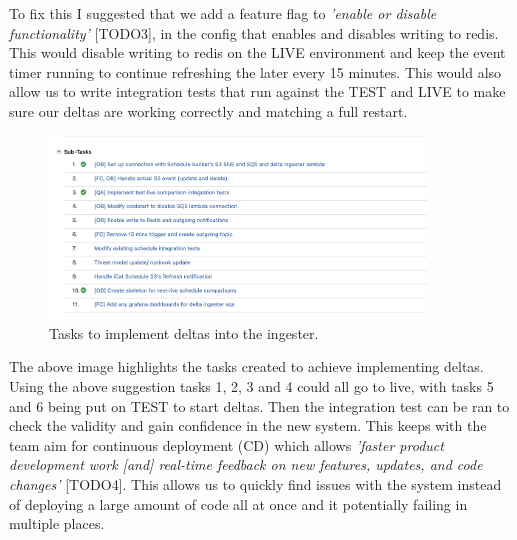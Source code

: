   To fix this I suggested that we add a feature flag to \textit{'enable or disable functionality'} [TODO3], in the config that enables and disables writing 
  to redis. This would disable writing to redis on the LIVE environment and keep the event timer running to continue refreshing the later every 15 minutes.
  This would also allow us to write integration tests that run against the TEST and LIVE to make sure our deltas are working correctly and matching a full 
  restart.

  \begin{figure}[H]
    \centering
    \includegraphics[width=10cm]{assets/scheduleDeltasTasks.png}
    \caption{Tasks to implement deltas into the ingester.}
    \label{fig:scheduleDeltasTasks}
  \end{figure}

  The above image highlights the tasks created to achieve implementing deltas. Using the above suggestion tasks 1, 2, 3 and 4 could all go to live,
  with tasks 5 and 6 being put on TEST to start deltas. Then the integration test can be ran to check the validity and gain confidence in the new 
  system. This keeps with the team aim for continuous deployment (CD) which allows \textit{'faster product development work [and] real-time feedback
  on new features, updates, and code changes'} [TODO4]. This allows us to quickly find issues with the system instead of deploying a large amount of 
  code all at once and it potentially failing in multiple places.

  \newpage
